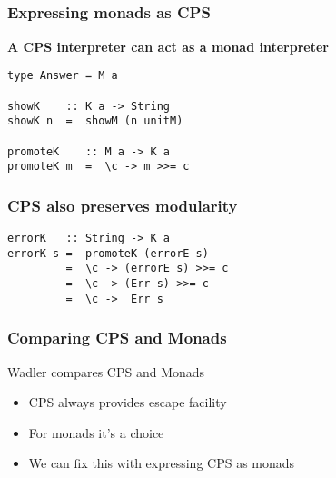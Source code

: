 \documentclass{beamer}
\begin{document}
\subsection{} 
\begin{frame}[fragile]
\frametitle{Expressing monads as CPS}
\textbf{A CPS interpreter can act as a monad interpreter}
\begin{lstlisting}
type Answer = M a

showK    :: K a -> String
showK n  =  showM (n unitM)

promoteK    :: M a -> K a
promoteK m  =  \c -> m >>= c
\end{lstlisting}


\end{frame}


\begin{frame}[fragile]
\frametitle{CPS also preserves modularity}
\begin{lstlisting}
errorK   :: String -> K a
errorK s =  promoteK (errorE s)
         =  \c -> (errorE s) >>= c
         =  \c -> (Err s) >>= c
         =  \c ->  Err s
\end{lstlisting}

\end{frame}


\begin{frame}[fragile]
\frametitle{Comparing CPS and Monads}
Wadler compares CPS and Monads
\begin{itemize}
\item CPS always provides escape facility
\item For monads it's a choice
\item We can fix this with expressing CPS as monads
\end{itemize}
\end{frame}
\end{document}
